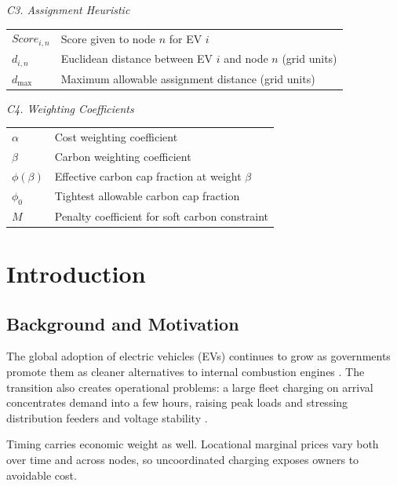 \documentclass[sustainability,article,submit,moreauthors,pdftex]{Definitions/mdpi}
\begin{document}
\noindent\textit{C3. Assignment Heuristic}\vspace{4pt}\\

\begin{tabular}{@{} p{2.2cm} p{10.3cm} }
$Score_{i,n}$ & Score given to node $n$ for EV $i$ \\
$d_{i,n}$ & Euclidean distance between EV $i$ and node $n$ (grid units) \\
$d_{\max}$ & Maximum allowable assignment distance (grid units) \\
\end{tabular}\vspace{10pt}

\noindent\textit{C4. Weighting Coefficients}\vspace{4pt}\\

\begin{tabular}{@{} p{2.2cm} p{10.3cm} }
$\alpha$ & Cost weighting coefficient \\
$\beta$ & Carbon weighting coefficient \\
$\phi(\beta)$ & Effective carbon cap fraction at weight $\beta$ \\
$\phi_0$ & Tightest allowable carbon cap fraction \\
$M$ & Penalty coefficient for soft carbon constraint \\
\end{tabular}\newpage

\section{Introduction}

\subsection{Background and Motivation}

The global adoption of electric vehicles (EVs) continues to grow as governments promote them as cleaner alternatives to internal combustion engines \cite{EV_adoption_growth}. The transition also creates operational problems: a large fleet charging on arrival concentrates demand into a few hours, raising peak loads and stressing distribution feeders and voltage stability \cite{uncoordinated_charging_grid_impacts}.

Timing carries economic weight as well. Locational marginal prices vary both over time and across nodes, so uncoordinated charging exposes owners to avoidable cost.
\end{document}

